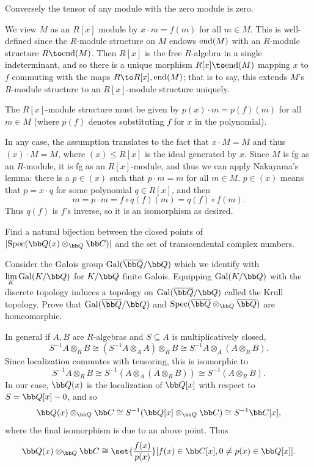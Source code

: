         Conversely the tensor of any module with the zero module is zero.
    \eenum

    \item We view $M$ as an $R[x]$ module by $x\cdot m=f(m)$ for all $m\in M$.
    This is well-defined since the $R$-module structure on $M$ endows ${\rm end}(M)$ with an $R$-module structure $R\to\endo(M)$.
    Then $R[x]$ is the free $R$-algebra in a single indeterminant, and so there is a unique morphism $R[x]\to\endo(M)$ mapping $x$ to $f$ commuting with the maps
    $R\to R[x],\endo(M)$; that is to say, this extends $M$'s $R$-module structure to an $R[x]$-module structure uniquely.

    The $R[x]$-module structure must be given by $p(x)\cdot m=p(f)(m)$ for all $m\in M$ (where $p(f)$ denotes substituting $f$ for $x$ in the polynomial).

    In any case, the assumption translates to the fact that $x\cdot M=M$ and thus $(x)\cdot M=M$, where $(x)\leq R[x]$ is the ideal generated by $x$.
    Since $M$ is fg as an $R$-module, it is fg as an $R[x]$-module, and thus we can apply Nakayama's lemma: there is a $p\in(x)$ such that $p\cdot m=m$ for all $m\in M$.
    $p\in(x)$ means that $p=x\cdot q$ for some polynomial $q\in R[x]$, and then
    $$ m = p\cdot m = f\circ q(f)(m) = q(f)\circ f(m) . $$
    Thus $q(f)$ is $f$'s inverse, so it is an isomorphism as desired.
\eenum

\bprob

    \benum
        \item Find a natural bijection between the closed points of $\abs{\spec(\bQ(x)\otimes_\bQ\bC)}$ and the set of transcendental complex numbers.
        \item Consider the Galois group $\Gal(\bar\bQ/\bQ)$ which we identify with $\lim_K\Gal(K/\bQ)$ for $K/\bQ$ finite Galois.
        Equipping $\Gal(K/\bQ)$ with the discrete topology induces a topology on $\Gal(\bar\bQ/\bQ)$ called the {\emphcolor Krull topology}.
        Prove that $\Gal(\bar\bQ/\bQ)$ and $\spec(\bar\bQ\otimes_\bQ\bar\bQ)$ are homeomorphic.
    \eenum

\eprob

\benum
    \item In general if $A,B$ are $R$-algebras and $S\subseteq A$ is multiplicatively closed, 
    $$ S^{-1}A\otimes_RB \cong (S^{-1}A\otimes_AA)\otimes_RB \cong S^{-1}A\otimes_A(A\otimes_RB) . $$
    Since localization commutes with tensoring, this is isomorphic to
    $$ S^{-1}A\otimes_RB \cong S^{-1}(A\otimes_A(A\otimes_RB)) \cong S^{-1}(A\otimes_RB) . $$
    In our case, $\bQ(x)$ is the localization of $\bQ[x]$ with respect to $S=\bQ[x]-0$, and so
    $$ \bQ(x)\otimes_\bQ\bC \cong S^{-1}(\bQ[x]\otimes_\bQ\bC) \cong S^{-1}\bC[x] , $$
    where the final isomorphism is due to an above point.
    Thus
    $$ \bQ(x) \otimes_\bQ \bC \cong \set{\frac{f(x)}{p(x)}}[{f(x)\in\bC[x],0\neq p(x)\in\bQ[x]}] . $$

